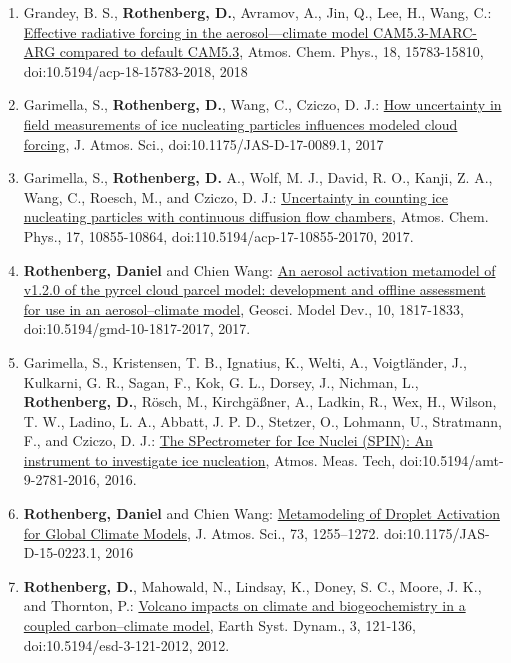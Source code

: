 \documentclass[11pt,letterpaper]{article}
\begin{document}
\begin{enumerate}[itemindent=-10pt]
 \item Grandey, B. S., \textbf{Rothenberg, D.}, Avramov, A., Jin, Q., Lee, H., Wang, C.: \href{https://doi.org/10.5194/acp-18-15783-2018}{Effective radiative forcing in the aerosol—climate model CAM5.3-MARC-ARG compared to default CAM5.3}, Atmos. Chem. Phys., 18, 15783-15810, doi:10.5194/acp-18-15783-2018, 2018

 \item Garimella, S., \textbf{Rothenberg, D.}, Wang, C., Cziczo, D. J.: \href{http://dx.doi.org/10.1175/JAS-D-17-0089.1}{How uncertainty in field measurements of ice nucleating particles influences modeled cloud forcing}, J. Atmos. Sci., doi:10.1175/JAS-D-17-0089.1, 2017

 \item Garimella, S., \textbf{Rothenberg, D.} A., Wolf, M. J., David, R. O., Kanji, Z. A., Wang, C., Roesch, M., and Cziczo, D. J.: \href{https://doi.org/10.5194/acp-17-10855-2017}{Uncertainty in counting ice nucleating particles with continuous diffusion flow chambers}, Atmos. Chem. Phys., 17, 10855-10864, doi:110.5194/acp-17-10855-20170, 2017.

 \item \textbf{Rothenberg, Daniel} and Chien Wang:  \href{http://dx.doi.org/10.5194/gmd-10-1817-2017}{An aerosol activation metamodel of v1.2.0 of the pyrcel cloud parcel model: development and offline assessment for use in an aerosol–climate model}, Geosci. Model Dev., 10, 1817-1833, doi:10.5194/gmd-10-1817-2017, 2017.

 \item Garimella, S., Kristensen, T. B., Ignatius, K., Welti, A., Voigtländer, J., Kulkarni, G. R., Sagan, F., Kok, G. L., Dorsey, J., Nichman, L., \textbf{Rothenberg, D.}, Rösch, M., Kirchgäßner, A., Ladkin, R., Wex, H., Wilson, T. W., Ladino, L. A., Abbatt, J. P. D., Stetzer, O., Lohmann, U., Stratmann, F., and Cziczo, D. J.: \href{http://www.atmos-meas-tech.net/9/2781/2016/amt-9-2781-2016.html}{The SPectrometer for Ice Nuclei (SPIN): An instrument to investigate ice nucleation}, Atmos. Meas. Tech, doi:10.5194/amt-9-2781-2016, 2016.

 \item \textbf{Rothenberg, Daniel} and Chien Wang: \href{http://dx.doi.org/10.1175/JAS-D-15-0223.1}{Metamodeling of Droplet Activation for Global Climate Models}, J. Atmos. Sci., 73, 1255–1272. doi:10.1175/JAS-D-15-0223.1, 2016

 \item \textbf{Rothenberg, D.}, Mahowald, N., Lindsay, K., Doney, S. C., Moore, J. K., and Thornton, P.: \href{http://dx.doi.org/10.5194/esd-3-121-2012}{Volcano impacts on climate and biogeochemistry in a coupled carbon–climate model}, Earth Syst. Dynam., 3, 121-136, doi:10.5194/esd-3-121-2012, 2012.


\end{enumerate}
\end{document}

